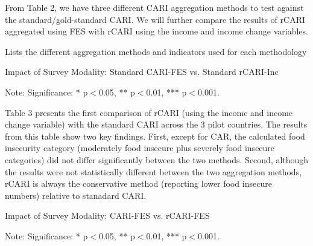 \documentclass[11pt,harvard]{article}
\begin{document}
From Table 2, we have three different CARI aggregation methods to test against the standard/gold-standard CARI. We will further compare the results of rCARI aggregated using FES with rCARI using the income and income change variables.

\begin{table}[htbp]
	\centering
	\begin{adjustbox}{max width=\textwidth}
		\begin{threeparttable}
			\caption{Lists the different aggregation methods and indicators used for each methodology}
			\scriptsize
			 
			\label{tab:Aggregation_Table}
		\end{threeparttable}
	\end{adjustbox}
\end{table}
 
\begin{table}[htbp]
	\centering
	\begin{adjustbox}{max width=\textwidth}
		\begin{threeparttable}
			\caption{Impact of Survey Modality: Standard CARI-FES vs. Standard rCARI-Inc}
			\scriptsize
			 
			\label{tab:CARI_rCARI_Modality_All_Country}
			\begin{tablenotes}
				\item Note: Significance: * p$<$0.05, ** p$<$0.01, *** p$<$0.001. 
			\end{tablenotes}
		\end{threeparttable}
	\end{adjustbox}
\end{table}

Table 3 presents the first comparison of rCARI (using the income and income change variable) with the standard CARI across the 3 pilot countries. The results from this table show two key findings. First, except for CAR, the calculated food insecurity category (moderately food insecure plus severely food insecure categories) did not differ significantly between the two methods. Second, although the results were not statistically different between the two aggregation methods, rCARI is always the conservative method (reporting lower food insecure numbers) relative to stanadard CARI.

\begin{table}[htbp]
	\centering
	\begin{adjustbox}{max width=\textwidth}
		\begin{threeparttable}
			\caption{Impact of Survey Modality: CARI-FES vs. rCARI-FES}
			\scriptsize
			 
			\label{tab:CARI_FES_rCARI_Modality_All_Country}
			\begin{tablenotes}
				\item Note: Significance: * p$<$0.05, ** p$<$0.01, *** p$<$0.001. 
			\end{tablenotes}
		\end{threeparttable}
	\end{adjustbox}
\end{table}
\end{document}

